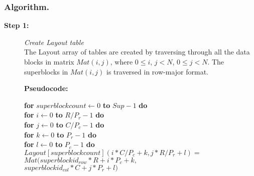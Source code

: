 \documentclass[letterpaper]{llncs}
\begin{document}
\subsubsection{Algorithm.}
\begin{description}
\item[\textbf{Step 1:}] \hspace{0.05in}\textit{Create Layout table}\\
The Layout array of tables are created by traversing through all the data blocks in 
matrix $Mat(i, j)$, where $0\leq i$, $j < N$, $0 \leq j <N$. The superblocks in $Mat(i, j)$ is traversed in row-major format.  

\textbf{Pseudocode:}
\vspace{-0.1in}
\begin{tabbing}
\hspace{0.3in}\textbf{for} $superblockcount \leftarrow 0$ \textbf{to} $Sup -1$ \textbf{do}\\ 
\hspace{0.5in}   \textbf{for}  $i \leftarrow 0$ \textbf{to} $R/P_{r} -1$ \textbf{do} \\
\hspace{0.7in}    \textbf{for}  $j \leftarrow 0$ \textbf{to} $C/P_{c} - 1$ \textbf{do}\\
\hspace{0.9in}     \textbf{for}  $k \leftarrow 0$ \textbf{to} $P_{r} - 1$ \textbf{do}\\
\hspace{1.1in}      \textbf{for}  $l \leftarrow 0$ \textbf{to} $P_{c} - 1 $ \textbf{do}\\ 
\hspace{1.3in}           $Layout[superblockcount](i\ast C/P_{c} + k, j \ast R/P_{r}+l) = $ \\
\hspace{2.2in}            $Mat(superblockid_{row}\ast R + i\ast P_{c} + k,$ \\
\hspace{2.2in}   	      $superblockid_{col}\ast C + j\ast P_r + l)$ \\


\end{tabbing}
\end{description}
\end{document}
